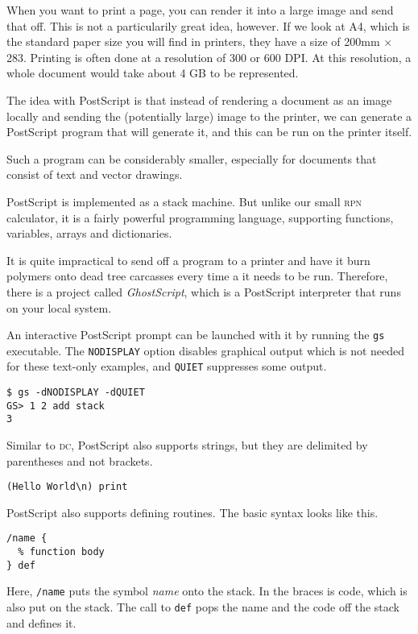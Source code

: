 \documentclass[a4paper,twocolumn]{article}
\begin{document}
When you want to print a page, you can render it into a large image and send that off. This is not a particularily great idea, however. If we look at A4, which is the standard paper size you will find in printers, they have a size of 200mm $\times$ 283. Printing is often done at a resolution of 300 or 600 DPI. At this resolution, a whole document would take about 4 GB to be represented.

The idea with PostScript is that instead of rendering a document as an image locally and sending the (potentially large) image to the printer, we can generate a PostScript program that will generate it, and this can be run on the printer itself.

Such a program can be considerably smaller, especially for documents that consist of text and vector drawings.

PostScript is implemented as a stack machine. But unlike our small \textsc{rpn} calculator, it is a fairly powerful programming language, supporting functions, variables, arrays and dictionaries.

It is quite impractical to send off a program to a printer and have it burn polymers onto dead tree carcasses every time a it needs to be run. Therefore, there is a project called \emph{GhostScript}, which is a PostScript interpreter that runs on your local system.

An interactive PostScript prompt can be launched with it by running the \verb|gs| executable. The \verb|NODISPLAY| option disables graphical output which is not needed for these text-only examples, and \verb|QUIET| suppresses some output.

\begin{verbatim}
$ gs -dNODISPLAY -dQUIET
GS> 1 2 add stack
3
\end{verbatim}

Similar to \textsc{dc}, PostScript also supports strings\cite{bluebook1985}, but they are delimited by parentheses and not brackets. 

\begin{verbatim}
(Hello World\n) print  
\end{verbatim}

PostScript also supports defining routines. The basic syntax looks like this.

\begin{verbatim}
/name {
  % function body
} def
\end{verbatim}

Here, \verb|/name| puts the symbol \emph{name} onto the stack. In the braces is code, which is also put on the stack. The call to \verb|def| pops the name and the code off the stack and defines it.
\end{document}

